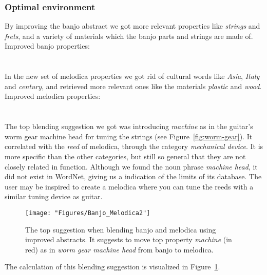 \subsubsection{Optimal environment}
By improving the banjo abstract we got more relevant properties like \emph{strings} and \emph{frets}, and a variety of materials which the banjo parts and strings are made of.
\\Improved banjo properties:\\
\noindent{}	
\\\\In the new set of melodica properties we got rid of cultural words like \emph{Asia}, \emph{Italy} and \emph{century}, and retrieved more relevant ones like the materials \emph{plastic} and \emph{wood}.
\\Improved melodica properties:\\
\noindent{}
\\\\The top blending suggestion we got was introducing \emph{machine} as in the guitar's worm gear machine head for tuning the strings (see Figure~\ref{fig:worm-gear}). It correlated with the \emph{reed} of melodica, through the category \emph{mechanical device}. It is more specific than the other categories, but still so general that they are not closely related in function. Although we found the noun phrase \emph{machine head}, it did not exist in WordNet, giving us a indication of the limits of its database. The user may be inspired to create a melodica where you can tune the reeds with a similar tuning device as guitar.
\begin{figure}[h] \centering \texttt{[image: "Figures/Banjo\_Melodica2"]} \caption[Blending banjo and melodica]{The top suggestion when blending banjo and melodica using improved abstracts. It suggests to move top property \emph{machine} (in red) as in \emph{worm gear machine head} from banjo to melodica. } \label{fig:Banjo-Melodica2} \end{figure}
The calculation of this blending suggestion is visualized in Figure~\ref{fig:Banjo-Melodica2}.

